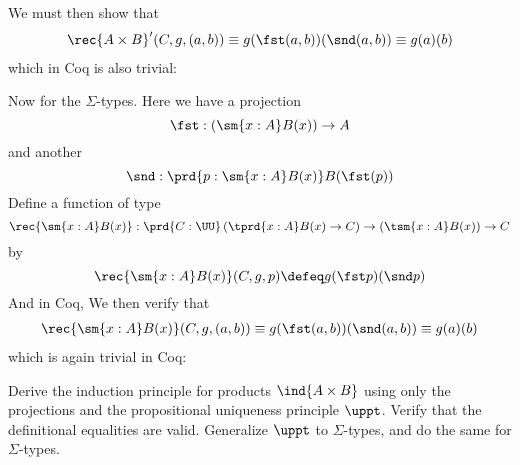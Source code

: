  

 

   
     

                       
        

 

\nwendcode{}We must then show that
\begin{align*}
  \rec{A\times B}'(C, g, (a, b)) 
  \equiv g(\fst (a, b))(\snd (a, b))
  \equiv g(a)(b)
\end{align*}
which in Coq is also trivial:

Now for the $\Sigma$-types.  Here we have a projection
\[
  \fst : \left(\sm{x : A} B(x) \right) \to A
\]
and another
\[
  \snd : \prd{p : \sm{x : A} B(x)} B(\fst (p))
\]
Define a function of type 
\[
  \rec{\sm{x:A}B(x)} : \prd{C:\UU} \left(\tprd{x:A} B(x) \to C \right) \to
  \left(\tsm{x:A}B(x) \right) \to C
\]
by
\[
  \rec{\sm{x:A}B(x)}(C, g, p)
  \defeq
  g(\fst p)(\snd p)
\]
And in Coq,
We then verify that
\begin{align*}
  \rec{\sm{x:A}B(x)}(C, g, (a, b))
  \equiv g(\fst (a, b))(\snd (a, b))
  \equiv g(a)(b)
\end{align*}
which is again trivial in Coq:

 Derive the induction principle for products $\ind{A \times B}$
using only the projections and the propositional uniqueness principle $\uppt$.
Verify that the definitional equalities are valid.  Generalize $\uppt$ to
$\Sigma$-types, and do the same for $\Sigma$-types.

